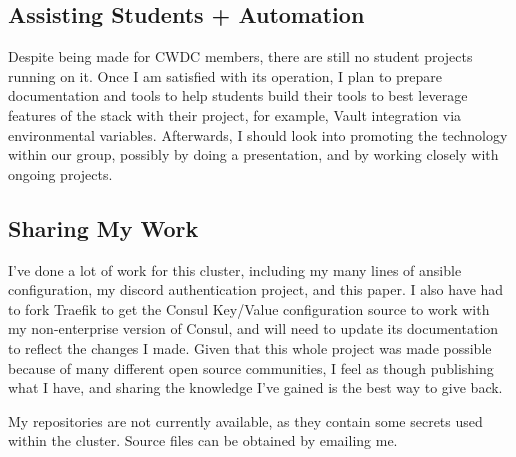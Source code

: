 \documentclass{article}
\begin{document}
\subsection{Assisting Students + Automation}
Despite being made for CWDC members, there are still no student projects running on it. Once I am satisfied with its operation, I plan to prepare documentation and tools to help students build their tools to best leverage features of the stack with their project, for example, Vault integration via environmental variables. Afterwards, I should look into promoting the technology within our group, possibly by doing a presentation, and by working closely with ongoing projects.

\subsection{Sharing My Work}
I've done a lot of work for this cluster, including my many lines of ansible configuration, my discord authentication project, and this paper. I also have had to fork Traefik to get the Consul Key/Value configuration source to work with my non-enterprise version of Consul, and will need to update its documentation to reflect the changes I made. Given that this whole project was made possible because of many different open source communities, I feel as though publishing what I have, and sharing the knowledge I've gained is the best way to give back.

My repositories are not currently available, as they contain some secrets used within the cluster. Source files can be obtained by emailing me.
\end{document}

